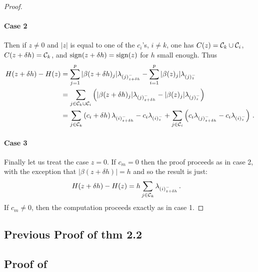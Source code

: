 \begin{proof}
  \paragraph{Case 2}
  Then if  $z \neq 0$ and $|z|$ is equal to one of the $c_i$'s, $i \neq k$,  one has $C(z) = \mathcal{C}_k \cup \mathcal{C}_i$, $C(z + \delta h) = \mathcal{C}_k$, and $\operatorname{sign}(z + \delta h) = \operatorname{sign}(z)$ for $h$ small enough.
  Thus
  \begin{align}
    H(z + \delta h) - H(z)
      &= \sum_{j =1}^p |\beta(z + \delta h)_j| \lambda_{(j)^-_{z + \delta h}}
          - \sum_{i=1}^p |\beta(z)_j| \lambda_{(j)^-_z}  \nonumber \\
      &= \sum_{j \in \mathcal{C}_k \cup \mathcal{C}_i} \left( |\beta(z + \delta h)_j| \lambda_{(j)^-_{z + \delta h}}
         - |\beta(z)_j| \lambda_{(j)^-_z} \right)  \nonumber \\
      &= \sum_{j \in \mathcal{C}_k} \left( c_i + \delta h \right) \lambda_{(i)^-_{z + \delta h}}
           - c_i \lambda_{(i)^-_z}
           + \sum_{j \in \mathcal{C}_i} \left( c_i \lambda_{(j)^-_{z + \delta h}}
           - c_i \lambda_{(i)^-_z} \right) \, .
  \end{align}

  \paragraph{Case 3} Finally let us treat the case $z = 0$.
  If $c_m = 0$ then the proof proceeds as in case 2, with the exception that $|\beta(z + \delta h)| = h$ and so the result is just:
  \begin{align}
    H(z + \delta h) - H(z)
      &= h \sum_{j \in \mathcal{C}_k} \lambda_{(i)^-_{z + \delta h}} \, .
  \end{align}
  If $c_m \neq 0$, then the computation proceeds exactly as in case 1.
\end{proof}

\subsection{Previous Proof of thm 2.2}


\subsection{Proof of }

